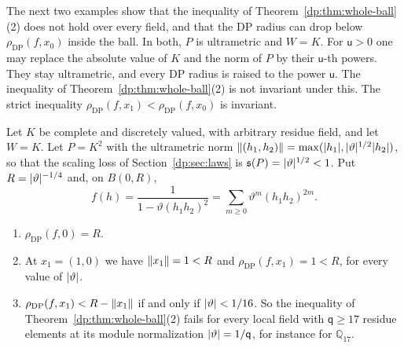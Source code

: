 The next two examples show that the inequality of Theorem~\ref{dp:thm:whole-ball}(2) does not hold over every field, and that the DP radius can drop below $\rho_{\mathrm{DP}}(f,x_0)$ inside the ball. In both, $P$ is ultrametric and $W=K$. For $\mathsf u>0$ one may replace the absolute value of $K$ and the norm of $P$ by their $\mathsf u$-th powers. They stay ultrametric, and every DP radius is raised to the power $\mathsf u$. The inequality of Theorem~\ref{dp:thm:whole-ball}(2) is not invariant under this. The strict inequality $\rho_{\mathrm{DP}}(f,x_1)<\rho_{\mathrm{DP}}(f,x_0)$ is invariant.

\begin{example}\label{dp:ex:radius-drop}
Let $K$ be complete and discretely valued, with arbitrary residue field, and let $W=K$. Let $P=K^2$ with the ultrametric norm $\lVert (h_1,h_2)\rVert=\max(\lvert h_1\rvert,\lvert \vartheta\rvert^{1/2}\lvert h_2\rvert)$, so that the scaling loss of Section~\ref{dp:sec:laws} is $\mathfrak s(P)=\lvert \vartheta\rvert^{1/2}<1$. Put $R=\lvert \vartheta\rvert^{-1/4}$ and, on $B(0,R)$,
\[
 f(h)=\frac1{1-\vartheta(h_1h_2)^2}=\sum_{m\ge0}\vartheta^m(h_1h_2)^{2m}.
\]
\begin{enumerate}
\item $\rho_{\mathrm{DP}}(f,0)=R$.
\item At $x_1=(1,0)$ we have $\lVert x_1\rVert=1<R$ and $\rho_{\mathrm{DP}}(f,x_1)=1<R$, for every value of $\lvert \vartheta\rvert$.
\item $\rho_{\mathrm{DP}}(f,x_1)<R-\lVert x_1\rVert$ if and only if $\lvert \vartheta\rvert<1/16$. So the inequality of Theorem~\ref{dp:thm:whole-ball}(2) fails for every local field with $\mathsf q\ge17$ residue elements at its module normalization $\lvert \vartheta\rvert=1/\mathsf q$, for instance for $\mathbb Q_{17}$.
\end{enumerate}
\end{example}

